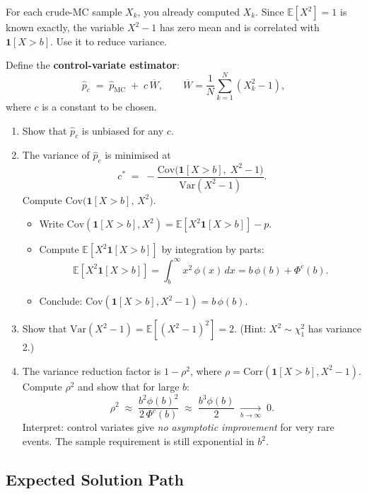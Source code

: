 \documentclass[12pt]{article}
\begin{document}
For each crude-MC sample $X_k$, you already computed $X_k$.
Since $\mathbb{E}[X^2] = 1$ is known exactly, the variable $X^2 - 1$ has zero mean and
is correlated with $\mathbf{1}[X > b]$.
Use it to reduce variance.

Define the \textbf{control-variate estimator}:
\[
  \hat{p}_{c} \;=\; \hat{p}_{\mathrm{MC}} \;+\; c\,\overline{W}, \qquad \overline{W} = \frac{1}{N}\sum_{k=1}^N (X_k^2 - 1),
\]
where $c$ is a constant to be chosen.

\begin{enumerate}[label=(\alph*)]

  \item Show that $\hat{p}_c$ is unbiased for any $c$.

  \item
  The variance of $\hat{p}_c$ is minimised at
  \[
    c^* \;=\; -\frac{\mathrm{Cov}\!\bigl(\mathbf{1}[X>b],\; X^2-1\bigr)}{\mathrm{Var}(X^2-1)}.
  \]
  Compute $\mathrm{Cov}\!\bigl(\mathbf{1}[X>b],\, X^2\bigr)$.
  \begin{itemize}
    \item Write $\mathrm{Cov}(\mathbf{1}[X>b], X^2) = \mathbb{E}[X^2\mathbf{1}[X>b]] - p$.
    \item Compute $\mathbb{E}[X^2\mathbf{1}[X>b]]$ by integration by parts:
    \[
      \mathbb{E}[X^2\mathbf{1}[X>b]]
      = \int_b^\infty x^2\,\phi(x)\,dx
      = b\,\phi(b) + \Phi^c(b).
    \]
    \item Conclude: $\mathrm{Cov}(\mathbf{1}[X>b], X^2-1) = b\,\phi(b)$.
  \end{itemize}

  \item Show that $\mathrm{Var}(X^2-1) = \mathbb{E}[(X^2-1)^2] = 2$.
  (Hint: $X^2 \sim \chi^2_1$ has variance 2.)

  \item The variance reduction factor is $1 - \rho^2$, where $\rho = \mathrm{Corr}(\mathbf{1}[X>b], X^2-1)$.
  Compute $\rho^2$ and show that for large $b$:
  \[
    \rho^2 \;\approx\; \frac{b^2\phi(b)^2}{2\,\Phi^c(b)} \;\approx\; \frac{b^3\phi(b)}{2}
    \;\xrightarrow[b\to\infty]{}\; 0.
  \]
  Interpret: control variates give \emph{no asymptotic improvement} for very rare events.
  The sample requirement is still exponential in $b^2$.

\end{enumerate}

\subsection*{Expected Solution Path}
\end{document}
